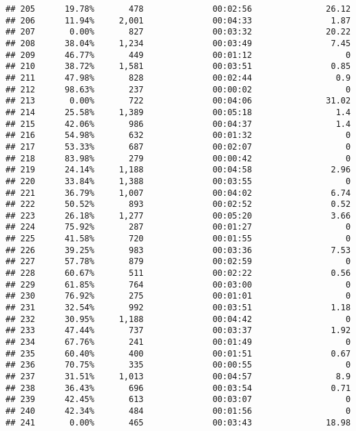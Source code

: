 \documentclass[
]{article}
\begin{document}
\begin{verbatim}
## 205      19.78%       478              00:02:56               26.12
## 206      11.94%     2,001              00:04:33                1.87
## 207       0.00%       827              00:03:32               20.22
## 208      38.04%     1,234              00:03:49                7.45
## 209      46.77%       449              00:01:12                   0
## 210      38.72%     1,581              00:03:51                0.85
## 211      47.98%       828              00:02:44                 0.9
## 212      98.63%       237              00:00:02                   0
## 213       0.00%       722              00:04:06               31.02
## 214      25.58%     1,389              00:05:18                 1.4
## 215      42.06%       986              00:04:37                 1.4
## 216      54.98%       632              00:01:32                   0
## 217      53.33%       687              00:02:07                   0
## 218      83.98%       279              00:00:42                   0
## 219      24.14%     1,188              00:04:58                2.96
## 220      33.84%     1,388              00:03:55                   0
## 221      36.79%     1,007              00:04:02                6.74
## 222      50.52%       893              00:02:52                0.52
## 223      26.18%     1,277              00:05:20                3.66
## 224      75.92%       287              00:01:27                   0
## 225      41.58%       720              00:01:55                   0
## 226      39.25%       983              00:03:36                7.53
## 227      57.78%       879              00:02:59                   0
## 228      60.67%       511              00:02:22                0.56
## 229      61.85%       764              00:03:00                   0
## 230      76.92%       275              00:01:01                   0
## 231      32.54%       992              00:03:51                1.18
## 232      30.95%     1,188              00:04:42                   0
## 233      47.44%       737              00:03:37                1.92
## 234      67.76%       241              00:01:49                   0
## 235      60.40%       400              00:01:51                0.67
## 236      70.75%       335              00:00:55                   0
## 237      31.51%     1,013              00:04:57                 8.9
## 238      36.43%       696              00:03:54                0.71
## 239      42.45%       613              00:03:07                   0
## 240      42.34%       484              00:01:56                   0
## 241       0.00%       465              00:03:43               18.98

\end{verbatim}
\end{document}
